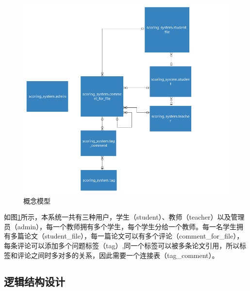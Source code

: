 \begin{figure}[ht]
    \centering
    \includegraphics[scale = 0.5]{out/uml/数据库/conceptual-model.png}
    \caption{\song\wuhao 概念模型}
    \label{conceptual-model}
\end{figure}

如图\ref{conceptual-model}所示，本系统一共有三种用户，学生（student）、教师（teacher）以及管理员（admin），每一个教师拥有多个学生，每个学生分给一个教师。每一名学生拥有多篇论文（student\_file），每一篇论文可以有多个评论（comment\_for\_file），每条评论可以添加多个问题标签（tag）,同一个标签可以被多条论文引用，所以标签和评论之间时多对多的关系，因此需要一个连接表（tag\_comment）。

\subsection{逻辑结构设计}

